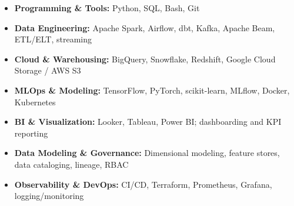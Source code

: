 \begin{itemize}[noitemsep, left=0pt]
    \item \textbf{Programming \& Tools:} Python, SQL, Bash, Git
    \item \textbf{Data Engineering:} Apache Spark, Airflow, dbt, Kafka, Apache Beam, ETL/ELT, streaming
    \item \textbf{Cloud \& Warehousing:} BigQuery, Snowflake, Redshift, Google Cloud Storage / AWS S3
    \item \textbf{MLOps \& Modeling:} TensorFlow, PyTorch, scikit-learn, MLflow, Docker, Kubernetes
    \item \textbf{BI \& Visualization:} Looker, Tableau, Power BI; dashboarding and KPI reporting
    \item \textbf{Data Modeling \& Governance:} Dimensional modeling, feature stores, data cataloging, lineage, RBAC
    \item \textbf{Observability \& DevOps:} CI/CD, Terraform, Prometheus, Grafana, logging/monitoring
\end{itemize}
\vspace{-13pt}